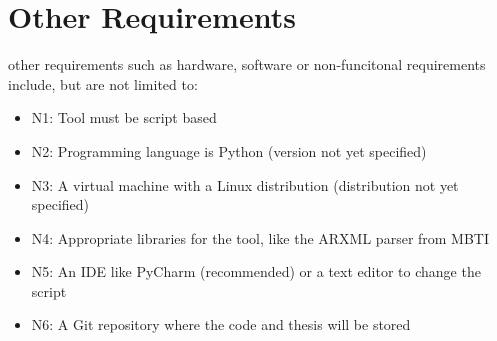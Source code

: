 \section{Other Requirements}
\label{chp:hardware-software}

other requirements such as hardware, software or non-funcitonal requirements include, but are not limited to:

\begin{itemize}
	\item N1\label{sec:n1}: Tool must be script based
	\item N2\label{sec:n2}: Programming language is Python (version not yet specified)
	\item N3\label{sec:n3}: A virtual machine with a Linux distribution (distribution not yet specified)
	\item N4\label{sec:n4}: Appropriate libraries for the tool, like the ARXML parser from MBTI
	\item N5\label{sec:n5}: An IDE like PyCharm (recommended) or a text editor to change the script
	\item N6\label{sec:n6}: A Git repository where the code and thesis will be stored
\end{itemize}
